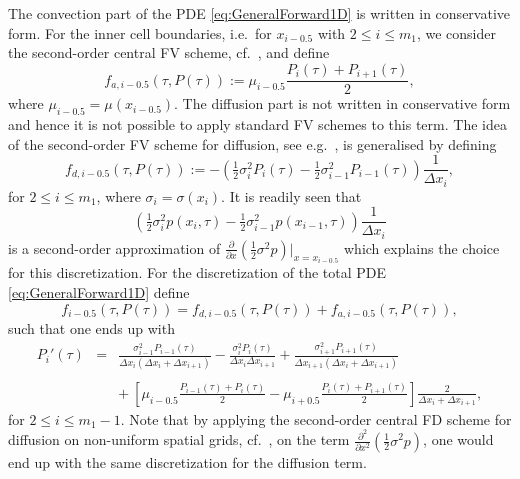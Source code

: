 \documentclass[10pt]{article}
\begin{document}
The convection part of the PDE \eqref{eq:GeneralForward1D} is written in conservative form. For the inner cell boundaries, i.e.\ for $x_{i-0.5}$ with $2 \le i \le m_{1}$, we consider the second-order central FV scheme, cf.\ \cite{HV03}, and define
\begin{equation}
f_{a,i-0.5}(\tau,P(\tau)) := \mu_{i-0.5} \frac{P_{i}(\tau) + P_{i+1}(\tau)}{2},
\end{equation}
where $\mu_{i-0.5}= \mu(x_{i-0.5})$. 
The diffusion part is not written in conservative form and hence it is not possible to apply standard FV schemes to this term. 
The idea of the second-order FV scheme for diffusion, see e.g.\ \cite{HV03}, is generalised by defining
\begin{equation}
f_{d,i-0.5}(\tau,P(\tau)) := -\left(\tfrac{1}{2} \sigma^{2}_{i} P_{i}(\tau) - \tfrac{1}{2} \sigma^{2}_{i-1} P_{i-1}(\tau)\right) \frac{1}{\Delta x_{i}},
\end{equation}
for $2 \le i \le m_{1}$, where $\sigma_{i} = \sigma(x_{i})$.
It is readily seen that 
$$  \left(\tfrac{1}{2} \sigma^{2}_{i}p(x_{i},\tau) - \tfrac{1}{2} \sigma^{2}_{i-1} p(x_{i-1},\tau)\right) \frac{1}{\Delta x_{i}} $$
is a second-order approximation of $ \tfrac{\partial}{\partial x} ( \tfrac{1}{2} \sigma^{2}p)\vert_{x=x_{i-0.5}}$ which explains the choice for this discretization.
For the discretization of the total PDE \eqref{eq:GeneralForward1D} define
\begin{equation}
f_{i - 0.5}(\tau,P(\tau)) = f_{d,i - 0.5}(\tau,P(\tau)) + f_{a,i - 0.5}(\tau,P(\tau)),
\end{equation} 
such that one ends up with
\begin{eqnarray}
P_{i}'(\tau) &=& \frac{\sigma^{2}_{i-1}P_{i-1}(\tau)}{\Delta x_{i} (\Delta x_{i} + \Delta x_{i+1})} - \frac{\sigma_{i}^{2}P_{i}(\tau)}{\Delta x_{i} \Delta x_{i+1}} + \frac{\sigma^{2}_{i+1}P_{i+1}(\tau)}{\Delta x_{i+1} (\Delta x_{i} + \Delta x_{i+1})} \label{eq:Discretization1DWithoutBoundary} \\ \nonumber \\
&& + \  \left[ \mu_{i-0.5} \frac{P_{i-1}(\tau)+P_{i}(\tau)}{2} - \mu_{i+0.5} \frac{P_{i}(\tau)+P_{i+1}(\tau)}{2} \right] \frac{2}{\Delta x_{i} + \Delta x_{i+1}}, \nonumber
\end{eqnarray}
for $ 2 \le i \le m_{1}-1$. Note that by applying the second-order central FD scheme for diffusion on non-uniform spatial grids, cf.\ \cite{IHF10}, on the term $\tfrac{\partial^{2}}{\partial x^{2}} ( \tfrac{1}{2} \sigma^{2}p)$, one would end up with the same discretization for the diffusion term.
\end{document}
